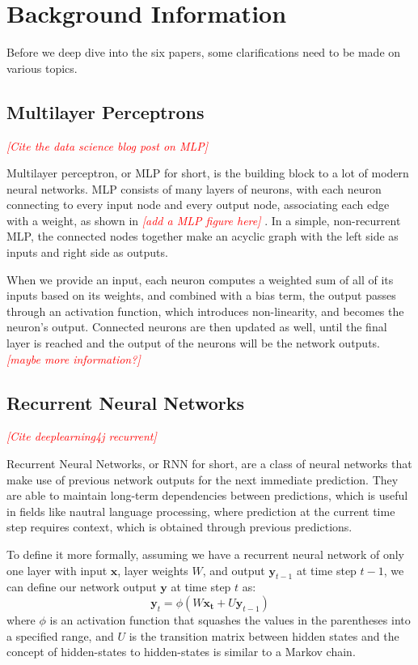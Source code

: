 \documentclass[10pt,twocolumn,letterpaper]{article}
\newcommand{\todo}[1]{\textcolor{red}{{\em [#1]}} }
\newcommand{\matr}[1]{\mathbf{#1}}
\newcommand{\bs}[1]{\boldsymbol{#1}}
\begin{document}
\section{Background Information}

Before we deep dive into the six papers, some clarifications need to be made
on various topics.

\subsection{Multilayer Perceptrons}
\todo{Cite the data science blog post on MLP}

Multilayer perceptron, or MLP for short, is the building block to a lot of
modern neural networks. MLP consists of many layers of neurons, with each
neuron connecting to every input node and every output node, associating each
edge with a weight, as shown in \todo{add a MLP figure here}. In a simple,
non-recurrent MLP, the connected nodes together make an acyclic graph with the
left side as inputs and right side as outputs. 

When we provide an input, each neuron computes a weighted sum of all of its
inputs based on its weights, and combined with a bias term, the output passes
through an activation function, which introduces non-linearity, and becomes
the neuron's output. Connected neurons are then updated as well, until the
final layer is reached and the output of the neurons will be the network
outputs. \todo{maybe more information?}

\subsection{Recurrent Neural Networks}
\todo{Cite deeplearning4j recurrent}

Recurrent Neural Networks, or RNN for short, are a class of neural networks
that make use of previous network outputs for the next immediate prediction.
They are able to maintain long-term dependencies between predictions, which is
useful in fields like nautral language processing, where prediction at the
current time step requires context, which is obtained through previous
predictions. 

To define it more formally, assuming we have a recurrent neural network of
only one layer with input $\matr{x}$, layer weights $W$, and output
$\bs{y}_{t-1}$ at time step $t-1$, we can define our network output
$\bs{y}$ at time step $t$ as:
%
\begin{equation}
  \bs{y}_t = \phi (W \matr{x_t} + U \bs{y}_{t-1})
\end{equation}
%
where $\phi$ is an activation function that squashes the values in the
parentheses into a specified range, and $U$ is the transition matrix between
hidden states and the concept of hidden-states to hidden-states is similar to
a Markov chain.
\end{document}
